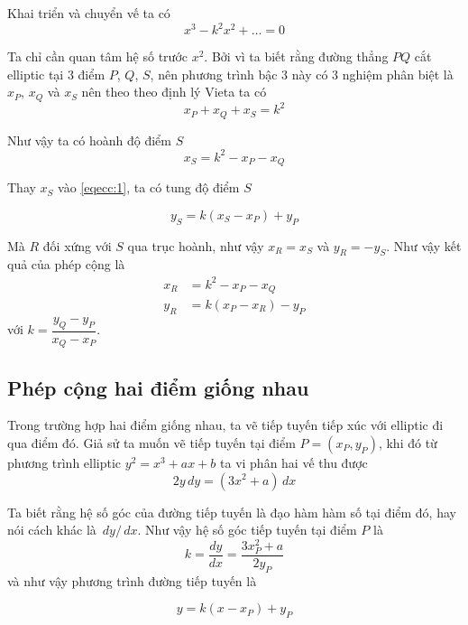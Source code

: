 Khai triển và chuyển vế ta có
\begin{equation}
    x^3 - k^2 x^2 + \ldots = 0
\end{equation}

Ta chỉ cần quan tâm hệ số trước $x^2$. Bởi vì ta biết rằng đường thẳng $PQ$ 
cắt elliptic tại 3 điểm $P$, $Q$, $S$, nên phương trình bậc 3 này có 3 nghiệm 
phân biệt là $x_P$, $x_Q$ và $x_S$ nên theo theo định lý Vieta ta có
\begin{equation*}
    x_P + x_Q + x_S = k^2
\end{equation*}

Như vậy ta có hoành độ điểm $S$
\begin{equation}
    x_S = k^2 - x_P - x_Q
\end{equation}

Thay $x_S$ vào \ref{eqecc:1}, ta có tung độ điểm $S$

\begin{equation}
    y_S = k(x_S - x_P) + y_P
\end{equation}

Mà $R$ đối xứng với $S$ qua trục hoành, như vậy $x_R = x_S$ và $y_R = -y_S$.
Như vậy kết quả của phép cộng là
\begin{align*}
    x_R & = k^2 - x_P - x_Q \\
    y_R & = k(x_P - x_R) - y_P
\end{align*}
với $k = \dfrac{y_Q - y_P}{x_Q - x_P}$.

\subsection*{Phép cộng hai điểm giống nhau}

Trong trường hợp hai điểm giống nhau, ta vẽ tiếp tuyến tiếp xúc với
elliptic đi qua điểm đó. Giả sử ta muốn vẽ tiếp tuyến tại 
điểm $P = (x_P, y_P)$, khi đó từ phương trình elliptic
$y^2 = x^3 + ax + b$ ta vi phân hai vế thu được
\begin{equation}
    2y \,dy = (3x^2 + a) \,dx
\end{equation}

Ta biết rằng hệ số góc của đường tiếp tuyến là đạo hàm hàm số
tại điểm đó, hay nói cách khác là $\,dy/\,dx$. Như vậy hệ số góc
tiếp tuyến tại điểm $P$ là
\begin{equation}
    k = \frac{dy}{dx} = \frac{3 x_P^2 + a}{2y_P}
\end{equation}
và như vậy phương trình đường tiếp tuyến là

\begin{equation}
    y = k(x-x_P) + y_P
\end{equation}

